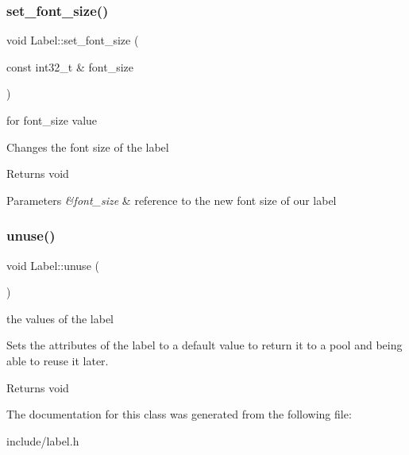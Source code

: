 \subsubsection{\texorpdfstring{set\+\_\+font\+\_\+size()}{set\_font\_size()}}
{\footnotesize\ttfamily void Label\+::set\+\_\+font\+\_\+size (\begin{DoxyParamCaption}\item[{const int32\+\_\+t \&}]{font\+\_\+size }\end{DoxyParamCaption})}

for font\+\_\+size value

Changes the font size of the label

\begin{DoxyReturn}{Returns}
void 
\end{DoxyReturn}

\begin{DoxyParams}{Parameters}
{\em \&font\+\_\+size} & reference to the new font size of our label \\
\hline
\end{DoxyParams}
\mbox{\label{class_label_abafe12b2237df6f7e915d407d8084ec7}} 
\subsubsection{\texorpdfstring{unuse()}{unuse()}}
{\footnotesize\ttfamily void Label\+::unuse (\begin{DoxyParamCaption}{ }\end{DoxyParamCaption})}

the values of the label

Sets the attributes of the label to a default value to return it to a pool and being able to reuse it later.

\begin{DoxyReturn}{Returns}
void 
\end{DoxyReturn}


The documentation for this class was generated from the following file\+:\begin{DoxyCompactItemize}
\item 
include/label.\+h\end{DoxyCompactItemize}
